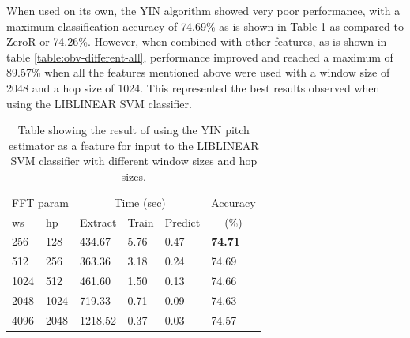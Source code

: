 When used on its own, the YIN algorithm showed very poor performance,
with a maximum classification accuracy of 74.69\% as is shown in Table
\ref{table:obv-different-yin} as compared to ZeroR or 74.26\%.
However, when combined with other features, as is shown in table
\ref{table:obv-different-all}, performance improved and reached a
maximum of 89.57\% when all the features mentioned above were used
with a window size of 2048 and a hop size of 1024.  This represented
the best results observed when using the LIBLINEAR SVM classifier.

\begin{table}
\begin{tabular}{|l|l|l|l|l|l|}
\hline
\multicolumn{2}{|c|}{FFT param} & \multicolumn{3}{c|}{Time (sec)} & Accuracy \\
\hhline{|-|-|-|-|-|~|}
ws & hp & Extract & Train & Predict & \multicolumn{1}{c|}{(\%)} \\
\hhline{|=|=|=|=|=|=|}
256 & 128    &   434.67  &    5.76  &   0.47  &  \textbf{74.71}  \\
512 & 256    &   363.36  &    3.18  &   0.24  &  74.69  \\
1024 & 512   &   461.60  &    1.50  &   0.13  &  74.66  \\
2048 & 1024  &   719.33  &    0.71  &   0.09  &  74.63  \\
4096 & 2048  &  1218.52  &    0.37  &   0.03  &  74.57  \\
\hline
\end{tabular}
\caption{Table showing the result of using the YIN pitch estimator as
  a feature for input to the LIBLINEAR SVM classifier with different
  window sizes and hop sizes.}
\label{table:obv-different-yin}
\end{table}



